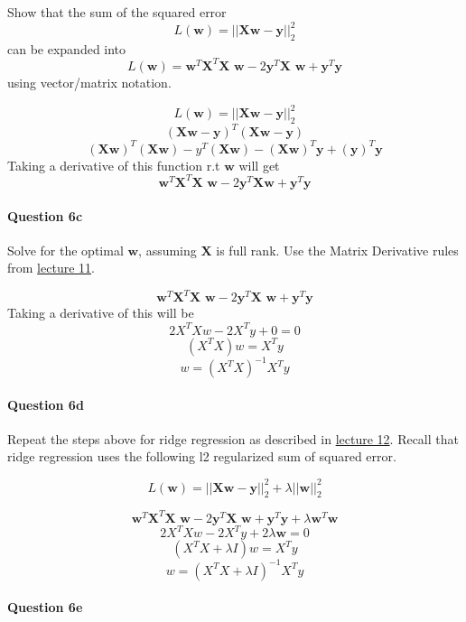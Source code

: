 \documentclass[11pt]{article}
\begin{document}
Show that the sum of the squared error
\[L(\textbf{w}) = ||\textbf{Xw}-\textbf{y}||_2^2\] can be expanded into
\[L(\textbf{w}) = \textbf{w}^T \textbf{X}^T \textbf{X w} - 2 \textbf{y}^T \textbf{X w} + \textbf{y}^T \textbf{y}\]
using vector/matrix notation.

    \[L(\textbf{w}) = ||\textbf{Xw}-\textbf{y}||_2^2\]
\[(\textbf{Xw}-\textbf{y})^T(\textbf{Xw}-\textbf{y})\]
\[(\textbf{Xw})^T(\textbf{Xw}) - y^T(\textbf{Xw}) - (\textbf{Xw})^T\textbf{y} + (\textbf{y})^T\textbf{y}\]
Taking a derivative of this function r.t \(\textbf{w}\) will get
\[\textbf{w}^T \textbf{X}^T \textbf{X w} - 2 \textbf{y}^T \textbf{Xw} + \textbf{y}^T \textbf{y}\]

    \paragraph{Question 6c}\label{question-6c}

Solve for the optimal \(\textbf{w}\), assuming \(\textbf{X}\) is full
rank. Use the Matrix Derivative rules from
\href{http://www.ds100.org/fa18/syllabus\#lecture-week-6}{lecture 11}.

    \[\textbf{w}^T \textbf{X}^T \textbf{X w} - 2 \textbf{y}^T \textbf{X w} + \textbf{y}^T \textbf{y}\]
Taking a derivative of this will be \[2X^TXw - 2X^Ty + 0 = 0\]
\[(X^TX)w = X^Ty\] \[w = (X^TX)^{-1}X^Ty\]

    \paragraph{Question 6d}\label{question-6d}

Repeat the steps above for ridge regression as described in
\href{http://www.ds100.org/fa18/syllabus\#lecture-week-6}{lecture 12}.
Recall that ridge regression uses the following l2 regularized sum of
squared error.

\[L(\textbf{w}) = ||\textbf{X}\textbf{w} - \textbf{y}||_2^2 + \lambda ||\textbf{w}||_2^2\]

    \[\textbf{w}^T \textbf{X}^T \textbf{X w} - 2 \textbf{y}^T \textbf{X w} + \textbf{y}^T \textbf{y} + \lambda \textbf{w}^T\textbf{w}\]
\[2X^TXw - 2X^Ty + 2\lambda \textbf{w} = 0\]
\[(X^TX + \lambda I)w = X^Ty\] \[w = (X^TX + \lambda I)^{-1}X^Ty\]

    \paragraph{Question 6e}\label{question-6e}
\end{document}
